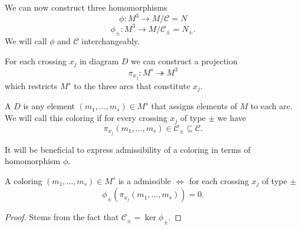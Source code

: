 We can now construct three homomorphisms
$$\phi:M^3\to M/\mathcal{C}=N$$
$$\phi_\pm:M^3\to M/\mathcal{C}_\pm=N_\pm.$$
We will call $\phi$ and $\mathcal{C}$  interchangeably.



For each crossing $x_j$ in diagram $D$ we can construct a projection 
$$\pi_{x_j}:M^s\twoheadrightarrow M^3$$
which restricts $M^s$ to the three arcs that constitute $x_j$.

\begin{definition}
  A  $D$ is any element $(m_1,..., m_s)\in M^s$ that assigns elements of $M$ to each arc. We will call this coloring  if for every crossing $x_j$ of type $\pm$ we have 
  $$\pi_{x_j}(m_1,..., m_s)\in \mathcal{C}_\pm\subseteq\mathcal{C}.$$
\end{definition}


It will be beneficial to express admissibility of a coloring in terms of homomorphism $\phi$.
\begin{proposition}
  A coloring $(m_1,..., m_s)\in M^s$ is a admissible $\iff$ for each crossing $x_j$ of type $\pm$ 
  $$\phi_\pm(\pi_{x_j}(m_1,...,m_s))=0.$$
\end{proposition}

\begin{proof}
  Stems from the fact that $\mathcal{C}_\pm=\ker\phi_\pm$.
\end{proof}


